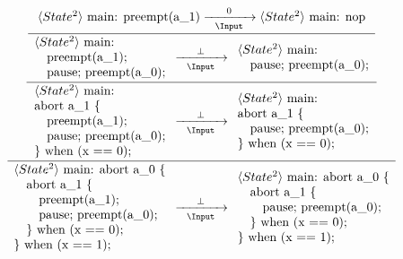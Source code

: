 \begin{equation*}
	\frac{
		\dfrac{
			\dfrac{
					\langle State^2 \rangle ~ \text{main: preempt(a\_1)}
						\xrightarrow[~~\Input~~]{0}
					\langle State^2 \rangle ~ \text{main: nop}
				}{
					\begin{array}{l}
						\langle State^2 \rangle ~ \text{main:}		\\
						\text{~~~preempt(a\_1);}					\\
						\text{~~~pause; preempt(a\_0);}				
					\end{array}
						\xrightarrow[~~\Input~~]{\bot} 
					\begin{array}{l}
						\langle State^2 \rangle ~ \text{main:}		\\
						\text{~~~pause; preempt(a\_0);}				
					\end{array}
				}
			}{
				\begin{array}{l}
					\langle State^2 \rangle ~ \text{main:}		\\
					\text{abort a\_1 \{}						\\
					\text{~~~preempt(a\_1);}					\\
					\text{~~~pause; preempt(a\_0);}				\\
					\text{\} when (x == 0);}					
				\end{array}
					\xrightarrow[~~\Input~~]{\bot} 
				\begin{array}{l}
					\langle State^2 \rangle ~ \text{main:}		\\
					\text{abort a\_1 \{}						\\
					\text{~~~pause; preempt(a\_0);}				\\
					\text{\} when (x == 0);}					
				\end{array}
			}
		}{
			\begin{array}{l}
				\langle State^2 \rangle ~ \text{main: abort a\_0 \{}	\\
				\text{~~~abort a\_1 \{}									\\
				\text{~~~~~~preempt(a\_1);}								\\
				\text{~~~~~~pause; preempt(a\_0);}						\\
				\text{~~~\} when (x == 0);}								\\
				\text{\} when (x == 1);}
			\end{array}
				\xrightarrow[~~\Input~~]{\bot} 
			\begin{array}{l}
				\langle State^2 \rangle ~ \text{main: abort a\_0 \{}\\
				\text{~~~abort a\_1 \{}								\\
				\text{~~~~~~pause; preempt(a\_0);}					\\
				\text{~~~\} when (x == 0);}							\\
				\text{\} when (x == 1);}
			\end{array}
		}
\end{equation*}
\newpage

